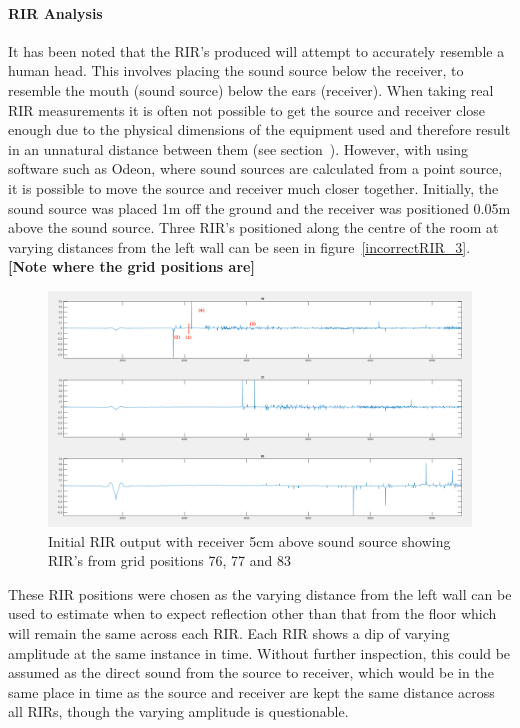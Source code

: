 \documentclass[../../main.tex]{subfiles}
\begin{document}
			\paragraph{RIR Analysis}
			It has been noted that the \ac{RIR}'s produced will attempt to accurately resemble a human head. This involves placing the sound source below the receiver, to resemble the mouth (sound source) below the ears (receiver). When taking real \ac{RIR} measurements it is often not possible to get the source and receiver close enough due to the physical dimensions of the equipment used and therefore result in an unnatural distance between them (see section~). However, with using software such as Odeon, where sound sources are calculated from a point source, it is possible to move the source and receiver much closer together. Initially, the sound source was placed 1m off the ground and the receiver was positioned 0.05m above the sound source. Three \ac{RIR}'s positioned along the centre of the room at varying distances from the left wall can be seen in figure~\ref{incorrectRIR_3}. \textbf{[Note where the grid positions are]}



			\begin{figure}[H]
				\centerline{\includegraphics[scale = 0.3]{Sections/Implementation/Odeon/images/incorrectRIR/RIR_76_incorrect_edit.png}}
				\caption{Initial \ac{RIR} output with receiver 5cm above sound source showing \ac{RIR}'s from grid positions 76, 77 and 83}
				\label{incorrectRIR}
			\end{figure}

			These \ac{RIR} positions were chosen as the varying distance from the left wall can be used to estimate when to expect reflection other than that from the floor which will remain the same across each \ac{RIR}. Each \ac{RIR} shows a dip of varying amplitude at the same instance in time. Without further inspection, this could be assumed as the direct sound from the source to receiver, which would be in the same place in time as the source and receiver are kept the same distance across all RIRs, though the varying amplitude is questionable.
\end{document}
